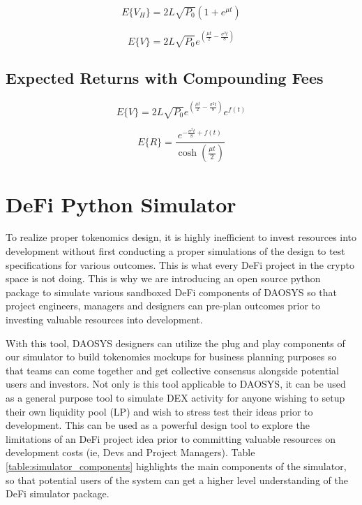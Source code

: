 \documentclass[journal,twocolumn,12pt]{ieeesyscoin}
\begin{document}
\lipsum[1]

\begin{equation}\label{eqn:held_portfolio}
  E\{V_{H}\} = 2 L \sqrt{P_{0}} (1 + e^{\mu t})
\end{equation}

\begin{equation}\label{eqn:portfolio_outside}
  E\{V\} = 2 L \sqrt{P_{0}}  e^{(\frac{\mu t}{2} - \frac{\sigma^2 t}{8})}
\end{equation}

\subsection{Expected Returns with Compounding Fees}
\label{sec:exp_lp_returns}

\lipsum[1]

\begin{equation}\label{eqn:portfolio_outside}
  E\{V\} = 2 L \sqrt{P_{0}}  e^{(\frac{\mu t}{2} - \frac{\sigma^2 t}{8})}e^{f(t)}
\end{equation}

\begin{equation}\label{eqn:exp_returns}
  E\{R\} = \frac{e^{-\frac{\sigma^2 t}{8} + f(t)}}{\cosh (\frac{\mu t}{2})}
\end{equation}

\section{DeFi Python Simulator}
\label{sec:python_simulator}

To realize proper tokenomics design, it is highly inefficient to invest resources into development without first conducting a proper simulations of the design to test specifications for various outcomes. This is what every DeFi project in the crypto space is not doing. This is why we are introducing an open source python package to simulate various sandboxed DeFi components of DAOSYS so that project engineers, managers and designers can pre-plan outcomes prior to investing valuable resources into development.

With this tool, DAOSYS designers can utilize the plug and play components of our simulator to build tokenomics mockups for business planning purposes so that teams can come together and get collective consensus alongside potential users and investors. Not only is this tool applicable to DAOSYS, it can be used as a general purpose tool to simulate DEX activity for anyone wishing to setup their own liquidity pool (LP) and wish to stress test their ideas prior to development. This can be used as a powerful design tool to explore the limitations of an DeFi project idea prior to committing valuable resources on development costs (ie, Devs and Project Managers). Table \ref{table:simulator_components} highlights the main components of the simulator, so that potential users of the system can get a higher level understanding of the DeFi simulator package.
\end{document}
